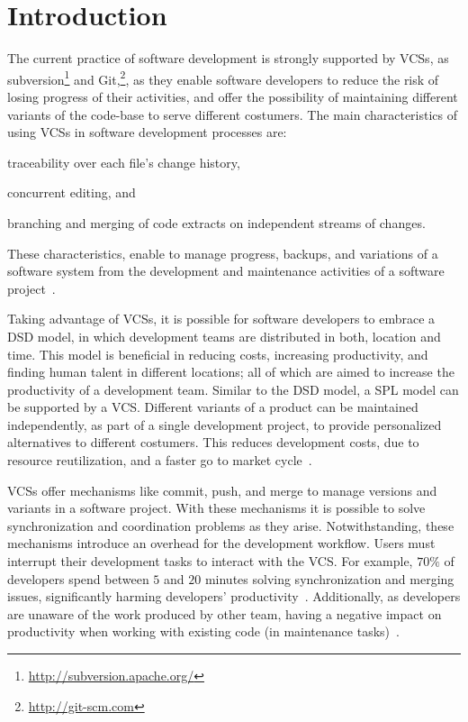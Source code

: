 
\section{Introduction}
\label{sec:introduction}

The current practice of software development is strongly supported by \acp{VCS}, as subversion\footnote{\url{http://subversion.apache.org/}} and Git,\footnote{\url{http://git-scm.com}}, as they enable software developers to reduce the risk of losing progress of their activities, and offer the possibility of maintaining different variants of the code-base to serve different costumers.
The main characteristics of using \acp{VCS} in software development processes are:
\begin{enumerate*}[label=(\arabic*)]
\item traceability over each file's change history, 
\item concurrent editing, and 
\item branching and merging of code extracts on independent streams of changes. 
\end{enumerate*}
These characteristics, enable to manage progress, backups, and variations of a software system from the development and maintenance activities of a software project~\cite{spinellis05}.

Taking advantage of \acp{VCS},  it is possible for software developers to embrace a \ac{DSD} model, in which development teams are distributed in both, location and time. This model is beneficial in reducing costs, increasing productivity, and finding human talent in different locations; all of which are aimed to increase the productivity of a development team. 
Similar to the \ac{DSD} model, a \ac{SPL} model can be supported by a \ac{VCS}. Different variants of a product can be maintained independently, as part of a single development project, to provide personalized alternatives to different costumers. This reduces development costs, due to resource reutilization, and a faster go to market cycle~\cite{klaus10}.  

\acp{VCS} offer mechanisms like commit, push, and merge to manage versions and variants in a software project. With these mechanisms it is possible to solve synchronization and coordination problems as they arise. 
Notwithstanding, these mechanisms introduce an overhead for the development workflow. Users must interrupt their development tasks to interact with the \ac{VCS}. For example, $70\%$ of developers spend between $5$ and  $20$ minutes solving synchronization and merging issues, significantly harming developers' productivity~\cite{estler14}. Additionally, as developers are unaware of the work produced by other team, having a negative impact on productivity when working with existing code (\eg in maintenance tasks)~\cite{dourish92}.

